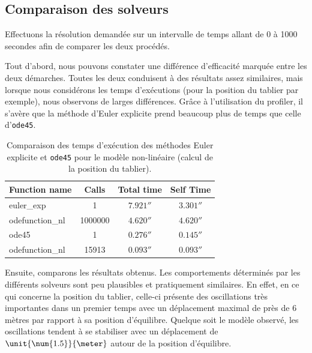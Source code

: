 \documentclass[a4paper, 12pt]{article}
\begin{document}
	\subsection{Comparaison des solveurs}
	Effectuons la résolution demandée sur un intervalle de temps allant de 0 à 1000 secondes afin de comparer les deux procédés.\par
	Tout d’abord, nous pouvons constater une différence d’efficacité marquée entre les deux démarches. Toutes les deux conduisent à des résultats assez similaires, mais lorsque nous considérons les temps d’exécutions (pour la position du tablier par exemple), nous observons de larges différences. Grâce à l’utilisation du profiler, il s'avère que la méthode d’Euler explicite prend beaucoup plus de temps que celle d’\texttt{ode45}.
	\begin{table}[H]
		\centering
		\begin{tabular}{| l | c | c | c |}
			\hline
			\textbf{Function name} & \textbf{Calls} & \textbf{Total time}                & \textbf{Self Time}                 \\ \hline\hline
			euler\_exp             & 1              & $\unit{\num{7.921}}{\second}$ & $\unit{\num{3.301}}{\second}$ \\ \hline
			odefunction\_nl        & 1000000        & $\unit{\num{4.620}}{\second}$ & $\unit{\num{4.620}}{\second}$ \\ \hline\hline
			ode45                  & 1              & $\unit{\num{0.276}}{\second}$ & $\unit{\num{0.145}}{\second}$ \\ \hline
			odefunction\_nl        & 15913          & $\unit{\num{0.093}}{\second}$ & $\unit{\num{0.093}}{\second}$ \\ \hline
		\end{tabular}
		\caption{Comparaison des temps d'exécution des méthodes Euler explicite et \texttt{ode45} pour le modèle non-linéaire (calcul de la position du tablier).}
	\end{table}
	Ensuite, comparons les résultats obtenus. Les comportements déterminés par les différents solveurs sont peu plausibles et pratiquement similaires. En effet, en ce qui concerne la position du tablier, celle-ci présente des oscillations très importantes dans un premier temps avec un déplacement maximal de près de 6 mètres par rapport à sa position d’équilibre. Quelque soit le modèle observé, les oscillations tendent à se stabiliser avec un déplacement de $\unit{\num{1.5}}{\meter}$ autour de la position d'équilibre.
\end{document}
